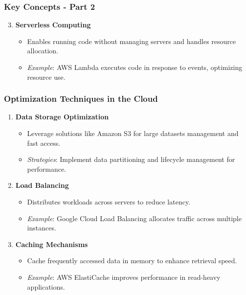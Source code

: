 \documentclass[aspectratio=169]{beamer}
\begin{document}
\begin{frame}[fragile]
    \frametitle{Key Concepts - Part 2}
    \begin{enumerate}
        \setcounter{enumi}{2} %
        \item \textbf{Serverless Computing}
        \begin{itemize}
            \item Enables running code without managing servers and handles resource allocation.
            \item \textit{Example}: AWS Lambda executes code in response to events, optimizing resource use.
        \end{itemize}
    \end{enumerate}
\end{frame}

\begin{frame}[fragile]
    \frametitle{Optimization Techniques in the Cloud}
    \begin{enumerate}
        \item \textbf{Data Storage Optimization}
        \begin{itemize}
            \item Leverage solutions like Amazon S3 for large datasets management and fast access.
            \item \textit{Strategies}: Implement data partitioning and lifecycle management for performance.
        \end{itemize}
        
        \item \textbf{Load Balancing}
        \begin{itemize}
            \item Distributes workloads across servers to reduce latency.
            \item \textit{Example}: Google Cloud Load Balancing allocates traffic across multiple instances.
        \end{itemize}
        
        \item \textbf{Caching Mechanisms}
        \begin{itemize}
            \item Cache frequently accessed data in memory to enhance retrieval speed.
            \item \textit{Example}: AWS ElastiCache improves performance in read-heavy applications.
        \end{itemize}
    \end{enumerate}
\end{frame}
\end{document}
